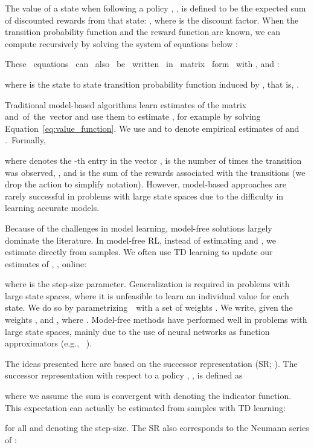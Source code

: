 \documentclass[letterpaper]{article} \usepackage{aaai20}  \usepackage{times}  \usepackage{helvet} \usepackage{courier}  \usepackage[hyphens]{url}  \usepackage{graphicx} \urlstyle{rm} \def\UrlFont{\rm}  \usepackage{graphicx}  \frenchspacing  \setlength{\pdfpagewidth}{8.5in}  \setlength{\pdfpageheight}{11in}  \usepackage{booktabs}
\begin{document}
The value of a state  when following a policy , , is defined to be the expected sum of discounted rewards from that state: , where  is the discount factor. When the transition probability function  and the reward function  are known, we can compute  recursively by solving the system of equations below \cite{Bellman57}:

These \ equations \ can \ also \ be \ written \ in \ matrix \ form \ with ,  and : 

where  is the state to state transition probability function induced by , that is, .

Traditional model-based algorithms learn estimates of the matrix  and~of~the~vector  and use them to estimate , for example by solving Equation~\ref{eq:value_function}. We use  and  to denote empirical estimates of  and .~Formally,

where  denotes the -th entry in the vector ,  is the number of times the transition  was observed, , and  is the sum of the rewards associated with the  transitions (we drop the action to simplify notation). However, model-based approaches are rarely successful in problems with large state spaces due to the difficulty in learning accurate models.

Because of the challenges in model learning, model-free solutions largely dominate the literature. In model-free RL, instead of estimating  and , we estimate  directly from samples. We often use TD learning \cite{Sutton88} to update our estimates of , , online:

where  is the step-size parameter. Generalization is required in problems with large state spaces, where it is unfeasible to learn an individual value for each state. We do so by parametrizing~~with a set of weights . We write, given the weights ,  and , where . Model-free methods have performed well in problems with large state spaces, mainly due to the use of neural networks as function approximators (e.g., \citeauthor{Mnih15}~\citeyear{Mnih15}).

The ideas presented here are based on the successor representation (SR; \citeauthor{Dayan93} \citeyear{Dayan93}). The successor representation with respect to a policy , , is defined as

where we assume the sum is convergent with  denoting the indicator function. This expectation can actually be estimated from samples with TD learning:

for all  and  denoting the step-size. The SR also corresponds to the Neumann series of :
\end{document}
